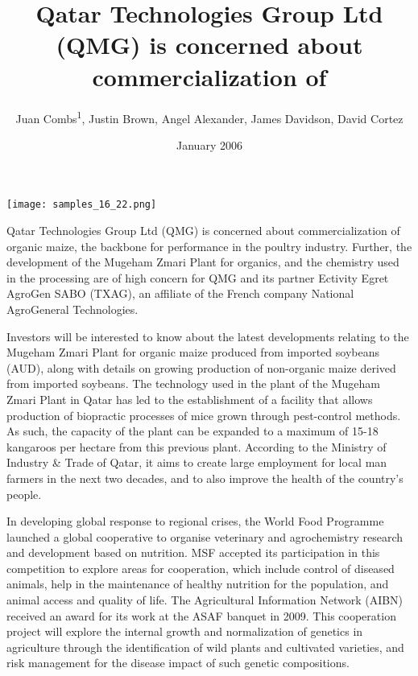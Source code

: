 \documentclass{article}
\title{Qatar Technologies Group Ltd (QMG) is concerned about commercialization of}
\author{Juan Combs\textsuperscript{1},  Justin Brown,  Angel Alexander,  James Davidson,  David Cortez}
\affil{\textsuperscript{1}Changsha University of Science and Technology}
\date{January 2006}
\begin{document}
\maketitle

\begin{center}
\begin{minipage}{0.75\linewidth}
\texttt{[image: samples\_16\_22.png]}
\end{minipage}
\end{center}

Qatar Technologies Group Ltd (QMG) is concerned about commercialization of organic maize, the backbone for performance in the poultry industry. Further, the development of the Mugeham Zmari Plant for organics, and the chemistry used in the processing are of high concern for QMG and its partner Ectivity Egret AgroGen SABO (TXAG), an affiliate of the French company National AgroGeneral Technologies.

Investors will be interested to know about the latest developments relating to the Mugeham Zmari Plant for organic maize produced from imported soybeans (AUD), along with details on growing production of non-organic maize derived from imported soybeans. The technology used in the plant of the Mugeham Zmari Plant in Qatar has led to the establishment of a facility that allows production of biopractic processes of mice grown through pest-control methods. As such, the capacity of the plant can be expanded to a maximum of 15-18 kangaroos per hectare from this previous plant. According to the Ministry of Industry \& Trade of Qatar, it aims to create large employment for local man farmers in the next two decades, and to also improve the health of the country’s people.

In developing global response to regional crises, the World Food Programme launched a global cooperative to organise veterinary and agrochemistry research and development based on nutrition. MSF accepted its participation in this competition to explore areas for cooperation, which include control of diseased animals, help in the maintenance of healthy nutrition for the population, and animal access and quality of life. The Agricultural Information Network (AIBN) received an award for its work at the ASAF banquet in 2009. This cooperation project will explore the internal growth and normalization of genetics in agriculture through the identification of wild plants and cultivated varieties, and risk management for the disease impact of such genetic compositions.
\end{document}
